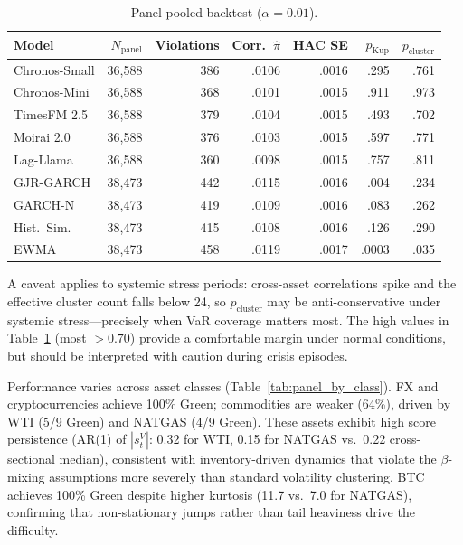 \documentclass[preprint,11pt,authoryear]{elsarticle}
\newcommand{\1}{\boldsymbol{1}}
\begin{document}
	\begin{table}[H]
		\centering
		\caption{Panel-pooled backtest ($\alpha = 0.01$).}
		\label{tab:panel}
		\footnotesize
		\begin{tabular}{@{}lrrrrrr@{}}
			\toprule
			Model & $N_{\text{panel}}$ & Violations & Corr.\ $\hat\pi$ & HAC SE & $p_{\text{Kup}}$ & $p_{\text{cluster}}$ \\
			\midrule
			Chronos-Small  & 36{,}588 & 386 & .0106 & .0016 & .295 & .761 \\
			Chronos-Mini   & 36{,}588 & 368 & .0101 & .0015 & .911 & .973 \\
			TimesFM 2.5    & 36{,}588 & 379 & .0104 & .0015 & .493 & .702 \\
			Moirai 2.0     & 36{,}588 & 376 & .0103 & .0015 & .597 & .771 \\
			Lag-Llama      & 36{,}588 & 360 & .0098 & .0015 & .757 & .811 \\
			\midrule
			GJR-GARCH      & 38{,}473 & 442 & .0115 & .0016 & .004 & .234 \\
			GARCH-N        & 38{,}473 & 419 & .0109 & .0016 & .083 & .262 \\
			Hist.\ Sim.    & 38{,}473 & 415 & .0108 & .0016 & .126 & .290 \\
			EWMA           & 38{,}473 & 458 & .0119 & .0017 & .0003 & .035 \\
			\bottomrule
		\end{tabular}
	\end{table}

	A caveat applies to systemic stress periods: cross-asset correlations spike and the effective cluster count falls below 24, so $p_{\text{cluster}}$ may be anti-conservative under systemic stress---precisely when VaR coverage matters most. The high values in Table~\ref{tab:panel} (most $> 0.70$) provide a comfortable margin under normal conditions, but should be interpreted with caution during crisis episodes.

	Performance varies across asset classes
	(Table~\ref{tab:panel_by_class}). FX and cryptocurrencies
	achieve 100\% Green; commodities are weaker (64\%), driven
	by WTI (5/9 Green) and NATGAS (4/9 Green). These assets
	exhibit high score persistence (AR(1) of $|s_t^V|$: 0.32
	for WTI, 0.15 for NATGAS vs.\ 0.22 cross-sectional median),
	consistent with inventory-driven dynamics that violate the
	$\beta$-mixing assumptions more severely than standard
	volatility clustering. BTC achieves 100\% Green despite
	higher kurtosis (11.7 vs.\ 7.0 for NATGAS), confirming that
	non-stationary jumps rather than tail heaviness drive the
	difficulty.
	
\end{document}
